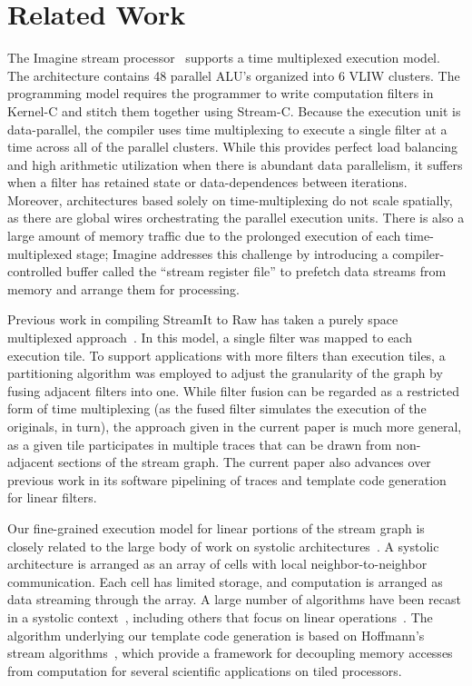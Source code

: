 \section{Related Work}
\label{sec:related}

The Imagine stream processor~\cite{rixner98bandwidthefficient}
supports a time multiplexed execution model.  The architecture
contains 48 parallel ALU's organized into 6 VLIW clusters.  The
programming model requires the programmer to write computation filters
in Kernel-C and stitch them together using Stream-C.  Because the
execution unit is data-parallel, the compiler uses time multiplexing
to execute a single filter at a time across all of the parallel
clusters.  While this provides perfect load balancing and high
arithmetic utilization when there is abundant data parallelism, it
suffers when a filter has retained state or data-dependences between
iterations.  Moreover, architectures based solely on
time-multiplexing do not scale spatially, as there are global wires
orchestrating the parallel execution units.  There is also a large
amount of memory traffic due to the prolonged execution of each
time-multiplexed stage; Imagine addresses this challenge by
introducing a compiler-controlled buffer called the ``stream register
file'' to prefetch data streams from memory and arrange them for
processing.

Previous work in compiling StreamIt to Raw has taken a purely space
multiplexed approach~\cite{streamit-asplos}.  In this model, a single
filter was mapped to each execution tile.  To support applications
with more filters than execution tiles, a partitioning algorithm was
employed to adjust the granularity of the graph by fusing adjacent
filters into one.  While filter fusion can be regarded as a restricted
form of time multiplexing (as the fused filter simulates the execution
of the originals, in turn), the approach given in the current paper is
much more general, as a given tile participates in multiple traces
that can be drawn from non-adjacent sections of the stream graph.  The
current paper also advances over previous work in its software
pipelining of traces and template code generation for linear filters.

Our fine-grained execution model for linear portions of the stream
graph is closely related to the large body of work on systolic
architectures~\cite{systolic78,systolic82}.  A systolic architecture
is arranged as an array of cells with local neighbor-to-neighbor
communication.  Each cell has limited storage, and computation is
arranged as data streaming through the array.  A large number of
algorithms have been recast in a systolic
context~\cite{leighton-book}, including others that focus on linear
operations~\cite{wu87systolic}.  The algorithm underlying our template
code generation is based on Hoffmann's stream
algorithms~\cite{hoffmann-streams}, which provide a framework for
decoupling memory accesses from computation for several scientific
applications on tiled processors.

